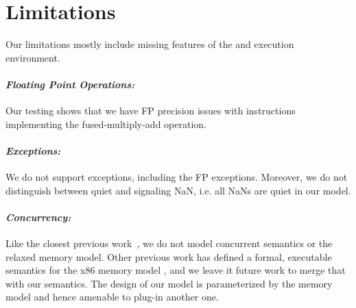 \section{Limitations}\label{sec:limit}
Our limitations mostly include missing features of the \ISA and execution environment.
\paragraph{\em Floating Point Operations:} Our testing shows that we have FP precision issues with instructions implementing the fused-multiply-add operation. 
\paragraph{\em Exceptions:} We do not support exceptions, including the FP exceptions. Moreover, we do not distinguish between quiet and signaling NaN, i.e. all NaNs are quiet in our model. 
\paragraph{\em Concurrency:} Like the closest previous work~\cite{Goel:FMCAD14,Heule2016a}, we do not model concurrent semantics or the relaxed memory model. Other previous work has defined a formal, executable semantics for the x86 memory model \cite{Sarkar:POPL09,Owens:x86-TSO}, and we leave it future work to merge that with our semantics. The design of our model  is parameterized by the memory model and hence amenable to plug-in another one.
